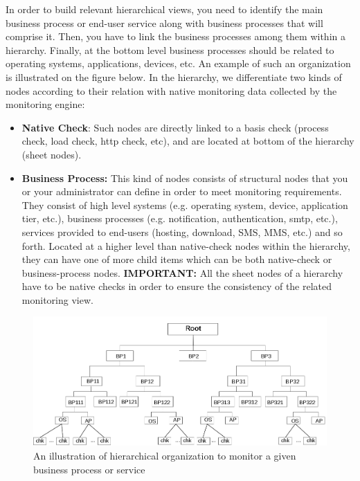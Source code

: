 \documentclass[a4paper,9pt]{article}
\begin{document}
In order to build relevant hierarchical views, you need to identify the main business process or end-user service along with business processes that will comprise it. Then, you have to link the business processes among them within a hierarchy. Finally, at the bottom level business processes should be related to operating systems, applications, devices, etc. An example of such an organization is illustrated on the figure below. 
In the hierarchy, we differentiate two kinds of nodes according to their relation with native monitoring data collected by the monitoring engine:
\begin{itemize}
 \item {\bf Native Check}: Such nodes are directly linked to a basis check
(process check, load check, http check, etc), and are located at bottom of the
hierarchy (sheet nodes).
 \item {\bf Business Process:} This kind of nodes consists of structural nodes
that you or your administrator can define in order to meet monitoring
requirements. They consist of high level systems (e.g. operating system, device,
application tier, etc.), business processes (e.g. notification, authentication,
smtp, etc.), services provided to end-users (hosting, download, SMS, MMS, etc.)
and so forth. Located at a higher level than native-check nodes within the
hierarchy, they can have one of more child items which can be both native-check
or business-process nodes. {\bf IMPORTANT:} All the sheet nodes of a hierarchy
have to be native checks in order to ensure the consistency of the related
monitoring view.   
\end{itemize}
\begin{figure}
\centering
\includegraphics[width=12cm]{images/hierarchical-mv.png}
\caption{An illustration of hierarchical organization to monitor a given business process or service}
\end{figure} 
\end{document}
